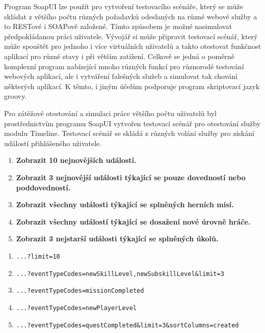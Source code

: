 \documentclass[twoside, 12pt]{article}
\begin{document}
{{\vspace{10}


Program SoapUI lze použít pro vytvoření testovacího scénáře,
který se může skládat z většího počtu různých požadavků odeslaných na různé webové služby a
to RESTové i SOAPově založené. Tímto způsobem je možné nasimulovat předpokládanou práci uživatele.
Vývojář si může připravit testovací scénář, který může spouštět pro jednoho i více virtuálních uživatelů a
takto otestovat funkčnost aplikací pro různé stavy i při větším zatížení.
Celkově se jedná o poměrně komplexní program nabízející mnoho různých funkcí
pro různorodé testování webových aplikací, ale i vytváření falešných služeb a simulovat tak chování některých aplikací.
K těmto, i jiným účelům podporuje program skriptovací jazyk groovy.

Pro zátěžové otestování a simulaci práce většího počtu uživatelů byl prostřednictvím
programu SoapUI vytvořen testovací scénář pro otestování služby modulu Timeline.
Testovací scénář se skládá z různých volání služby pro získání událostí přihlášeného uživatele.


\begin{enumerate}
\item \textbf{Zobrazit 10 nejnovějších událostí.}
\item \textbf{Zobrazit 3 nejnovější události týkající se pouze dovedností nebo poddovedností.}
\item \textbf{Zobrazit všechny události týkající se splněných herních misí.}
\item \textbf{Zobrazit všechny událostí týkající se dosažení nové úrovně hráče.}
\item \textbf{Zobrazit 3 nejstarší události týkající se splněných úkolů.}
\end{enumerate}



\begin{enumerate}
\item \texttt{...?limit=10}
\item \texttt{...?eventTypeCodes=newSkillLevel,newSubskillLevel\&limit=3}
\item \texttt{...?eventTypeCodes=missionCompleted}
\item \texttt{...?eventTypeCodes=newPlayerLevel}
\item \texttt{...?eventTypeCodes=questCompleted\&limit=3\&sortColumns=created}
\end{enumerate}

}}
\end{document}
